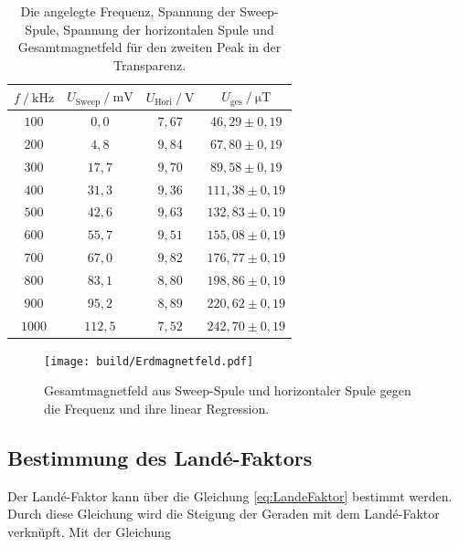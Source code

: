 \begin{table}[H]
    \centering
    \caption{Die angelegte Frequenz, Spannung der Sweep-Spule, Spannung der horizontalen Spule und Gesamtmagnetfeld für den zweiten Peak in der Transparenz.}
    \label{tab:Messung2}
    \begin{tabular}{c c c c}
    \toprule
      $ f \mathbin{/} \unit{\kilo\hertz}$ & $U_{\text{Sweep}} \mathbin{/} \unit{\milli\volt}$ & $U_{\text{Hori}} \mathbin{/} \unit{\volt}$ & $U_{\text{ges}} \mathbin{/} \unit{\micro\tesla}$ \\
    \midrule
        $100$ &     $ 0,0    $    &   $7,67$     &$46,29   \pm 0,19$     \\ 
        $200$ &     $ 4,8  $    &   $9,84$     &$67,80   \pm 0,19$     \\ 
        $300$ &     $ 17,7 $    &   $9,70$     &$89,58   \pm 0,19$    \\ 
        $400$ &     $ 31,3 $    &   $9,36$     &$111,38  \pm 0,19$    \\ 
        $500$ &     $ 42,6 $    &   $9,63$     &$132,83  \pm 0,19$    \\ 
        $600$ &     $ 55,7 $    &   $9,51$     &$155,08  \pm 0,19$    \\ 
        $700$ &     $ 67,0 $    &   $9,82$     &$176,77  \pm 0,19$    \\ 
        $800$ &     $ 83,1 $    &   $8,80$     &$198,86  \pm 0,19$    \\ 
        $900$ &     $ 95,2 $    &   $8,89$     &$220,62  \pm 0,19$    \\ 
        $1000$ &    $ 112,5$    &   $7,52$     &$242,70  \pm 0,19$    \\ 
    \bottomrule
    \end{tabular}
    \end{table}


\begin{figure}[H]
    \centering
    \texttt{[image: build/Erdmagnetfeld.pdf]}
    \caption{Gesamtmagnetfeld aus Sweep-Spule und horizontaler Spule gegen die Frequenz und ihre linear Regression.}
    \label{fig:Gesamtmagnetfeld}
\end{figure}

\subsection{Bestimmung des Landé-Faktors}

Der Landé-Faktor kann über die Gleichung \eqref{eq:LandeFaktor} bestimmt werden.
Durch diese Gleichung wird die Steigung der Geraden mit dem Landé-Faktor verknüpft.
Mit der Gleichung

